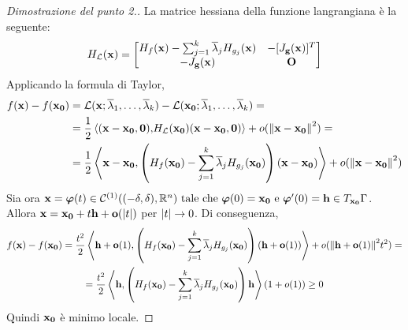 \begin{proof}
    [Dimostrazione del punto 2.]
    La matrice hessiana della funzione langrangiana è la seguente:
    $$
        H_{\mathcal{L}}(\vb{x})=
        \begin{bmatrix}
            H_f(\vb{x})-\sum_{j=1}^k\overline{\lambda}_j H_{g_j}(\vb{x})
            & -[J_{\vb{g}}(\vb{x})]^T\\
            -J_{\vb{g}}(\vb{x}) & \vb{O}
        \end{bmatrix}
    $$
    Applicando la formula di Taylor,
    \begin{align*}
        f(\vb{x})-f(\vb{x_0})&=\mathcal{L}(\vb{x};\overline{\lambda}_1,\dots,\overline{\lambda}_k)-\mathcal{L}(\vb{x_0};\overline{\lambda}_1,\dots,\overline{\lambda}_k)=\\
        &=\frac{1}{2}\left\langle(\vb{x}-\vb{x_0},\vb{0}){,}H_{\mathcal{L}}(\vb{x_0})(\vb{x}-\vb{x_0},\vb{0})\right\rangle+o(\norm{\vb{x}-\vb{x_0}}^2)=\\
        &=\frac{1}{2}\left\langle\vb{x}-\vb{x_0}{,}\left( H_f(\vb{x_0})-\sum_{j=1}^k\overline{\lambda}_j H_{g_j}(\vb{x_0}) \right)(\vb{x}-\vb{x_0})\right\rangle+o(\norm{\vb{x}-\vb{x_0}}^2)
    \end{align*}
    Sia ora $\vb{x}=\bm\varphi(t)\in \mathcal{C}^{(1)}((-\delta,\delta),\mathbb{R}^n) \text{ tale che } \bm\varphi(0)=\vb{x_0} \text{ e } \bm\varphi'(0)=\vb{h} \in T_{\vb{x_0}}\Gamma$. Allora $\vb{x}=\vb{x_0}+t\vb{h}+\vb{o}(\abs{t})$ per $\abs{t}\to 0$. Di conseguenza,
    \begin{gather*}
        f(\vb{x})-f(\vb{x_0})=\frac{t^2}{2}\left\langle\vb{h}+\vb{o}(1){,}\left( H_f(\vb{x_0})-\sum_{j=1}^k\overline{\lambda}_j H_{g_j}(\vb{x_0}) \right)(\vb{h}+\vb{o}(1))\right\rangle+o(\norm{\vb{h}+\vb{o}(1)}^2t^2)=\\
        =\frac{t^2}{2}\left\langle\vb{h}{,}\left( H_f(\vb{x_0})-\sum_{j=1}^k\overline{\lambda}_j H_{g_j}(\vb{x_0}) \right)\vb{h}\right\rangle(1+o(1))\geq 0
    \end{gather*}
    Quindi $\vb{x_0}$ è minimo locale.
\end{proof}